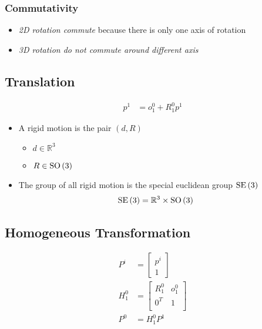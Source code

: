     \subsubsection{Commutativity}

      \begin{itemize}
        \item \emph{2D rotation commute} because there is only one axis of rotation
        \item \emph{3D rotation do not commute around different axis}
      \end{itemize}

  \subsection{Translation}

    \begin{align}
      p^{1} &= o^{0}_{1} + R^{0}_{1} p^{1}
    \end{align}

    \begin{itemize}
      \item A rigid motion is the pair $ \left( d, R \right) $
      \begin{itemize}
        \item $ d \in \mathbb{R}^{3} $
        \item $ R \in \operatorname{SO}\left( 3 \right) $
      \end{itemize}

      \item The group of all rigid motion is the special euclidean group
      $ \operatorname{SE}\left( 3 \right) $
      \begin{align}
        \operatorname{SE}\left( 3 \right) &= \mathbb{R}^{3} \times \operatorname{SO}\left( 3 \right)
      \end{align}
    \end{itemize}

  \subsection{Homogeneous Transformation}

    \begin{align}
      P^{i} &=
        \begin{bmatrix}
          p^{i} \\
          1
        \end{bmatrix} \\
      H^{0}_{1} &=
        \begin{bmatrix}
          R^{0}_{1} & o^{0}_{1} \\
          0^{T} & 1 \\
        \end{bmatrix} \\
      P^{0} &= H^{0}_{1} P^{1}
    \end{align}

